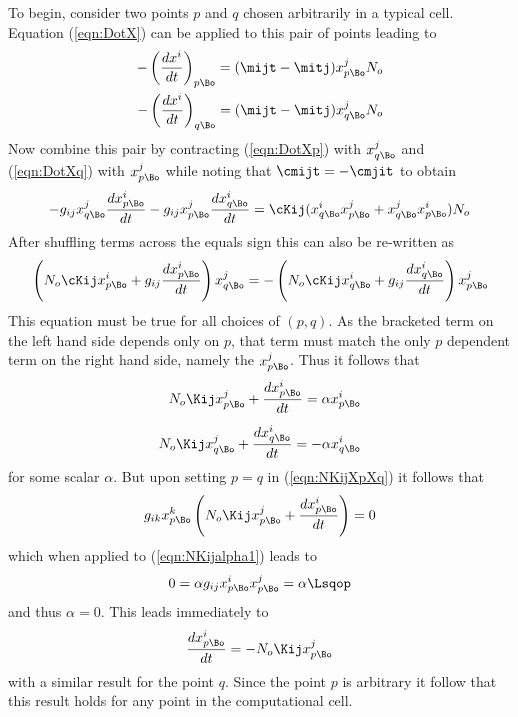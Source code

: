 \documentclass[a4paper,12pt]{article}
\numberwithin{equation}{section}
\begin{document}
To begin, consider
two points $p$ and $q$ chosen arbitrarily in a typical cell. Equation (\ref{eqn:DotX}) can
be applied to this pair of points leading to
\begin{align}
   \label{eqn:DotXp} -\left(\frac{dx^i}{dt}\right)_{p\Bo} = (\mijt-\mitj) x^j_{p\Bo} N_o\\
   \label{eqn:DotXq} -\left(\frac{dx^i}{dt}\right)_{q\Bo} = (\mijt-\mitj) x^j_{q\Bo} N_o
\end{align}
Now combine this pair by contracting (\ref{eqn:DotXp}) with $x^j_{q\Bo}$ and
(\ref{eqn:DotXq}) with $x^j_{p\Bo}$ while noting that $\cmijt=-\cmjit$ to obtain
\begin{align}
   - g_{ij} x^j_{q\Bo} \frac{dx^i_{p\Bo}}{dt}
   - g_{ij} x^j_{p\Bo} \frac{dx^i_{q\Bo}}{dt}
   = \cKij (x^i_{q\Bo}x^j_{p\Bo}+x^j_{q\Bo}x^i_{p\Bo}) N_o
\end{align}
After shuffling terms across the equals sign this can also be re-written as
\begin{align}
   \left(N_o\cKij x^i_{p\Bo} + g_{ij}\frac{dx^i_{p\Bo}}{dt}\right) x^j_{q\Bo}
   =
   - \left(N_o\cKij x^i_{q\Bo} + g_{ij}\frac{dx^i_{q\Bo}}{dt}\right) x^j_{p\Bo}
   \label{eqn:NKijXpXq}
\end{align}
This equation must be true for all choices of $(p,q)$. As the bracketed term on the left
hand side depends only on $p$, that term must match the only $p$ dependent term on the
right hand side, namely the $x^j_{p\Bo}$. Thus it follows that
\begin{align}
   N_o\Kij x^j_{p\Bo} + \frac{dx^i_{p\Bo}}{dt}
      =   \alpha x^i_{p\Bo}\label{eqn:NKijalpha1}\\[5pt]
   N_o\Kij x^j_{q\Bo} + \frac{dx^i_{q\Bo}}{dt}
      = - \alpha x^i_{q\Bo}\label{eqn:NKijalpha2}
\end{align}
for some scalar $\alpha$. But upon setting $p=q$ in (\ref{eqn:NKijXpXq}) it follows that
\begin{align}
   g_{ik} x^k_{p\Bo} \left(N_o\Kij x^j_{p\Bo} + \frac{dx^i_{p\Bo}}{dt}\right) = 0
\end{align}
which when applied to (\ref{eqn:NKijalpha1}) leads to
\begin{align}
   0 = \alpha g_{ij} x^i_{p\Bo} x^j_{p\Bo} = \alpha \Lsqop
\end{align}
and thus $\alpha=0$. This leads immediately to
\begin{align}
   \frac{dx^i_{p\Bo}}{dt} = - N_o\Kij x^j_{p\Bo}
\end{align}
with a similar result for the point $q$. Since the point $p$ is arbitrary it follow that
this result holds for any point in the computational cell.
\end{document}
